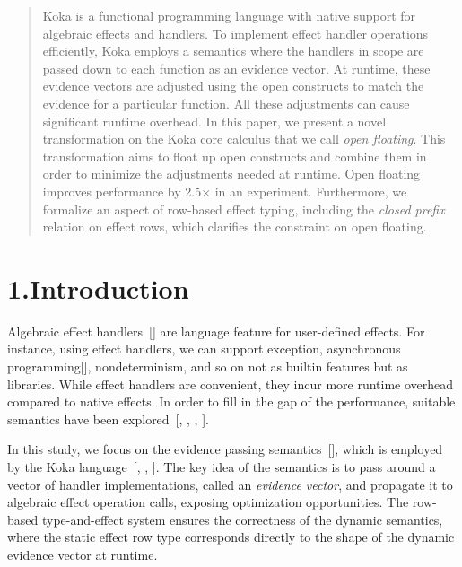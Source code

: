 \documentclass{llncs}
\begin{document}

\mdxauthorend{}\mdxtitleblockend%

\begin{abstract}%

\noindent Koka is a functional programming language with native support for algebraic effects and handlers.
To implement effect handler operations efficiently, Koka employs a semantics where the handlers
in scope are passed down to each function as an evidence vector.
At runtime, these evidence vectors are adjusted using the open constructs to match the evidence
for
 a particular function. All these adjustments can cause significant runtime overhead.
In this paper, we present a novel transformation on the Koka core calculus
that we call \emph{open floating}. This transformation aims to float up open constructs and combine
them in order to minimize the adjustments needed at runtime.
Open floating improves performance by 2.5\ensuremath{\times} in an experiment.
Furthermore, we formalize an aspect of row-based effect typing,
including the \emph{closed prefix} relation on effect rows, which
clarifies the constraint on open floating.%
\end{abstract}%



\section{1.\hspace*{0.5em}Introduction}%

\noindent Algebraic effect handlers~[] are language feature for user-defined effects.
For instance, using effect handlers, we can support exception, asynchronous programming[],
nondeterminism, and so on not as builtin features but as libraries.
While effect handlers are convenient, they incur more runtime overhead compared to native effects.
In order to fill in the gap of the performance, suitable semantics have been explored~[, , , ].%

In this study, we focus on the evidence passing semantics~[],
which is employed by the Koka language~[, , ].
The key idea of the semantics is to pass around a vector of handler implementations,
called an \emph{evidence vector}, and propagate it to algebraic effect operation calls,
exposing optimization opportunities. The row-based type-and-effect system ensures the correctness of
the dynamic semantics, where the static effect row type corresponds directly to the shape of the dynamic
evidence vector at runtime.%
\end{document}
